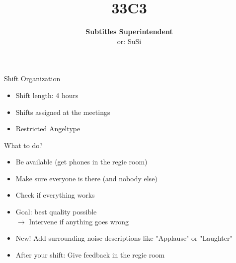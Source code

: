 \documentclass[utf8,widescreen]{beamer}
\title{\Huge \textbf{33C3}}
\subtitle{{\Large \textbf{Subtitles Superintendent}}\\
or: SuSi}
\date{}
\begin{document}
\begin{frame}{\titlepage}
\end{frame}

\begin{frame}{Shift Organization}
\pause
\begin{block}{}
\begin{itemize}\itemsep 14pt
\item{Shift length: 4 hours}
\pause
\item{Shifts assigned at the meetings}
\pause
\item{Restricted Angeltype}
\end{itemize}
\end{block}
\end{frame}

\begin{frame}{What to do?}
\pause
\begin{block}{}
\begin{itemize}\itemsep 12pt
\item{Be available (get phones in the regie room)}
\pause
\item{Make sure everyone is there (and nobody else)}
\pause
\item{Check if everything works}
\pause
\item{Goal: best quality possible\\
\pause
$\rightarrow$ Intervene if anything goes wrong}
\pause
\item{{\color{red}New!} Add surrounding noise descriptions like "Applause" or "Laughter"}
\pause
\item{After your shift: Give feedback in the regie room}
\end{itemize}
\end{block}
\end{frame}
\end{document}
